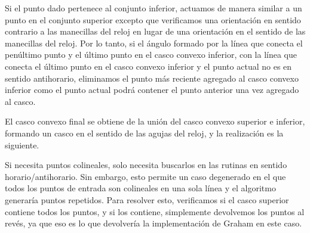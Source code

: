Si el punto dado pertenece al conjunto inferior, actuamos de manera similar a un punto en el conjunto superior excepto que verificamos una orientación en sentido contrario a las manecillas del reloj en lugar de una orientación en el sentido de las manecillas del reloj. Por lo tanto, si el ángulo formado por la línea que conecta el penúltimo punto y el último punto en el casco convexo inferior, con la línea que conecta el último punto en el casco convexo inferior y el punto actual no es en sentido antihorario, eliminamos el punto más reciente agregado al casco convexo inferior como el punto actual podrá contener el punto anterior una vez agregado al casco.

El casco convexo final se obtiene de la unión del casco convexo superior e inferior, formando un casco en el sentido de las agujas del reloj, y la realización es la siguiente.

Si necesita puntos colineales, solo necesita buscarlos en las rutinas en sentido horario/antihorario. Sin embargo, esto permite un caso degenerado en el que todos los puntos de entrada son colineales en una sola línea y el algoritmo generaría puntos repetidos. Para resolver esto, verificamos si el casco superior contiene todos los puntos, y si los contiene, simplemente devolvemos los puntos al revés, ya que eso es lo que devolvería la implementación de Graham en este caso.
